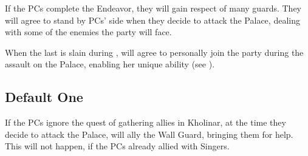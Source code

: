 If the PCs complete the Endeavor, they will gain respect of many guards. They will agree to stand by PCs' side when they decide to attack the Palace, dealing with some of the enemies the party will face.

When the last \enemySingerHaevenlyOne{} is slain during , \npcHighmarshal{} will agree to personally join the party during the assault on the Palace, enabling her unique ability (see ).



\subsection{Default One}

If the PCs ignore the quest of gathering allies in Kholinar, at the time they decide to attack the Palace, \npcKaladin{} will ally the Wall Guard, bringing them for help. This will not happen, if the PCs already allied with Singers.
